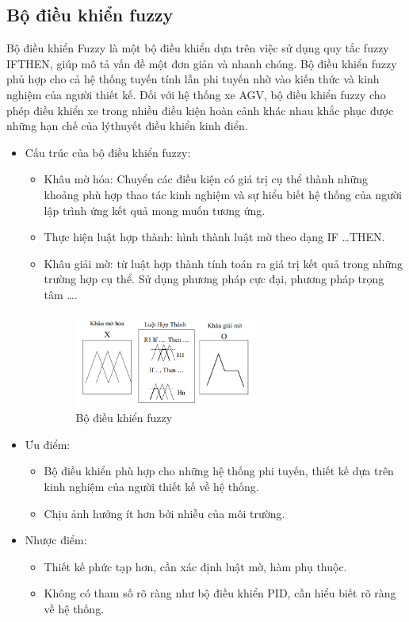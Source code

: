    \subsection{Bộ điều khiển fuzzy}
    \hspace*{0.6cm}Bộ điều khiển Fuzzy là một bộ điều khiển dựa trên việc sử dụng quy tắc fuzzy IFTHEN, giúp mô tả vấn đề một đơn giản và nhanh chóng. Bộ điều khiển fuzzy phủ hợp
    cho cả hệ thống tuyến tính lẫn phi tuyến nhờ vào kiến thức và kinh nghiệm của người
    thiết kế. Đối với hệ thống xe AGV, bộ điều khiển fuzzy cho phép điều khiển xe trong
    nhiều điều kiện hoàn cảnh khác nhau khắc phục được những hạn chế của lýthuyết điều
    khiển kinh điển.
    \begin{itemize}
        \item Cấu trúc của bộ điều khiển fuzzy:
        \begin{itemize}
            \item Khâu mờ hóa: Chuyển các điều kiện có giá trị cụ thể thành những khoảng phù
            hợp thao tác kinh nghiệm và sự hiểu biết hệ thống của người lập trình ứng kết quả mong
            muốn tương ứng.
            \item Thực hiện luật hợp thành: hình thành luật mờ theo dạng IF \dots THEN.
            \item Khâu giải mờ: từ luật hợp thành tính toán ra giá trị kết quả trong những trường
            hợp cụ thể. Sử dụng phương pháp cực đại, phương pháp trọng tâm \dots.
            \begin{figure}[H]
                \centering
                \includegraphics[width=0.6\textwidth]{pictures/chapter1/chapter1_pic21_fuzzy.png}
                \caption{Bộ điều khiển fuzzy}
                \label{chap1_pic21}
            \end{figure}          
        \end{itemize}
        \item Ưu điểm: 
        \begin{itemize}
            \item Bộ điều khiển phù hợp cho những hệ thống phi tuyến, thiết kế dựa trên kinh nghiệm của người thiết kế về hệ thống.
            \item Chịu ảnh hưởng ít hơn bởi nhiễu của môi trường.
        \end{itemize}
        \item Nhược điểm:
        \begin{itemize}
            \item Thiết kế phức tạp hơn, cần xác định luật mờ, hàm phụ thuộc.
            \item Không có tham số rõ ràng như bộ điều khiển PID, cần hiểu biết rõ ràng về hệ thống.
        \end{itemize}
    \end{itemize} 
